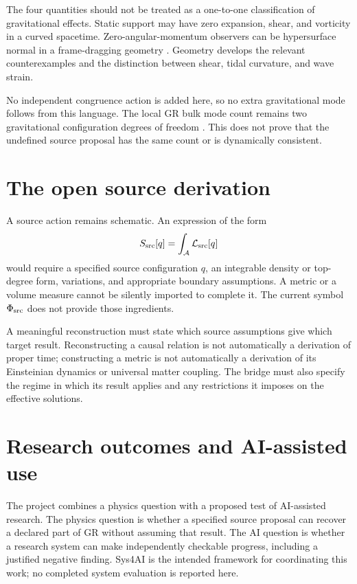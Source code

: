 \documentclass[11pt]{article}
\begin{document}
The four quantities should not be treated as a one-to-one classification of gravitational effects. Static support may have zero expansion, shear, and vorticity in a curved spacetime. Zero-angular-momentum observers can be hypersurface normal in a frame-dragging geometry \parencite{Gourgoulhon2010}. Geometry develops the relevant counterexamples and the distinction between shear, tidal curvature, and wave strain.

No independent congruence action is added here, so no extra \Aflow{} gravitational mode follows from this language. The local GR bulk mode count remains two gravitational configuration degrees of freedom \parencite{ADM1962}. This does not prove that the undefined source proposal has the same count or is dynamically consistent.

\section{The open source derivation}
A source action remains schematic. An expression of the form
\begin{equation}
S_{\rm src}[q]=\int_{\mathcal A}\mathcal L_{\rm src}[q]
\label{eq:substrateaction}
\end{equation}
would require a specified source configuration $q$, an integrable density or top-degree form, variations, and appropriate boundary assumptions. A metric or a volume measure cannot be silently imported to complete it. The current symbol $\Phi_{\mathrm{src}}$ does not provide those ingredients.

A meaningful reconstruction must state which source assumptions give which target result. Reconstructing a causal relation is not automatically a derivation of proper time; constructing a metric is not automatically a derivation of its Einsteinian dynamics or universal matter coupling. The bridge must also specify the regime in which its result applies and any restrictions it imposes on the effective solutions.


\section{Research outcomes and AI-assisted use}
The project combines a physics question with a proposed test of AI-assisted research. The physics question is whether a specified source proposal can recover a declared part of GR without assuming that result. The AI question is whether a research system can make independently checkable progress, including a justified negative finding. Sys4AI is the intended framework for coordinating this work; no completed system evaluation is reported here.
\end{document}
